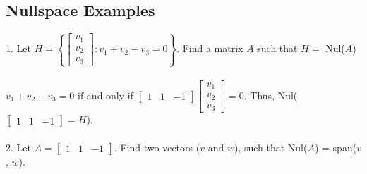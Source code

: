 \subsection{Nullspace Examples}
1. Let $H = \left\{\begin{bmatrix} v_1 \\ v_2 \\ v_3 \end{bmatrix} : v_1 + v_2 - v_3 = 0 \right\}$. Find 
a matrix $A$ such that $H =$ Nul($A$)
\\\\ $v_1 + v_2 - v_3 = 0$ if and only if $\begin{bmatrix} 1 & 1 & -1 \end{bmatrix}
\begin{bmatrix}v_1 \\ v_2 \\ v_3 \end{bmatrix} = 0$. Thus, 
Nul($\begin{bmatrix} 1 & 1 & -1 \end{bmatrix} = H$). \\\\
2. Let $A = \begin{bmatrix} 1 & 1 & -1 \end{bmatrix}$. Find two vectors ($v$ and $w$), such that Nul($A$) = span($v$, $w$). 

